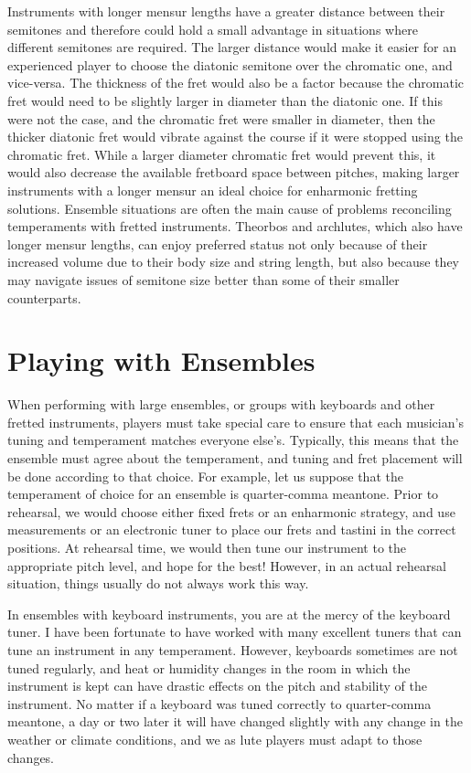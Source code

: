Instruments with longer mensur lengths have a greater distance between their semitones and therefore could hold a small
advantage in situations where different semitones are required. The larger distance would make it easier for an
experienced player to choose the diatonic semitone over the chromatic one, and vice-versa. The thickness of the fret
would also be a factor because the chromatic fret would need to be slightly larger in diameter than the diatonic one. If
this were not the case, and the chromatic fret were smaller in diameter, then the thicker diatonic fret would vibrate
against the course if it were stopped using the chromatic fret. While a larger diameter chromatic fret would prevent
this, it would also decrease the available fretboard space between pitches, making larger instruments with a longer
mensur an ideal choice for enharmonic fretting solutions. Ensemble situations are often the main cause of problems
reconciling temperaments with fretted instruments. Theorbos and archlutes, which also have longer mensur lengths, can
enjoy preferred status not only because of their increased volume due to their body size and string length, but also
because they may navigate issues of semitone size better than some of their smaller counterparts.

\section{Playing with Ensembles}

When performing with large ensembles, or groups with keyboards and other fretted instruments, players must take special
care to ensure that each musician's tuning and temperament matches everyone else's. Typically, this means that the
ensemble must agree about the temperament, and tuning and fret placement will be done according to that choice. For
example, let us suppose that the temperament of choice for an ensemble is quarter-comma meantone. Prior to rehearsal, we
would choose either fixed frets or an enharmonic strategy, and use measurements or an electronic tuner to place our
frets and tastini in the correct positions. At rehearsal time, we would then tune our instrument to the appropriate
pitch level, and hope for the best! However, in an actual rehearsal situation, things usually do not always work this
way.

In ensembles with keyboard instruments, you are at the mercy of the keyboard tuner. I have been fortunate to have worked
with many excellent tuners that can tune an instrument in any temperament. However, keyboards sometimes are not tuned
regularly, and heat or humidity changes in the room in which the instrument is kept can have drastic effects on the
pitch and stability of the instrument. No matter if a keyboard was tuned correctly to quarter-comma meantone, a day or
two later it will have changed slightly with any change in the weather or climate conditions, and we as lute players
must adapt to those changes.

